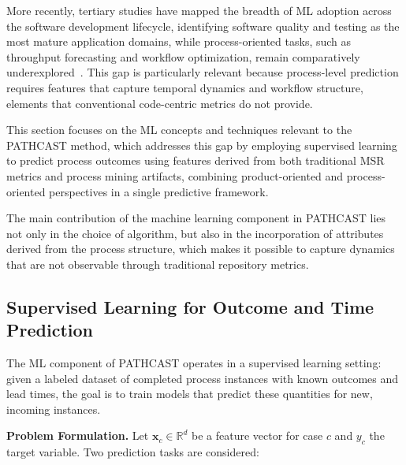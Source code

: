 More recently, tertiary
studies have mapped the breadth of ML adoption across the software development
lifecycle, identifying software quality and testing as the most mature
application domains, while process-oriented tasks, such as throughput
forecasting and workflow optimization, remain comparatively
underexplored~\cite{kotti2023}. This gap is particularly relevant because
process-level prediction requires features that capture temporal dynamics
and workflow structure, elements that conventional code-centric metrics
do not provide.

This section focuses on the ML concepts and techniques
relevant to the PATHCAST method, which addresses this gap by employing
supervised learning to predict process outcomes using features derived from
both traditional MSR metrics and process mining artifacts, combining
product-oriented and process-oriented perspectives in a single predictive
framework.

The main contribution of the machine learning component in PATHCAST lies not only in the choice of algorithm, but also in the incorporation of attributes derived from the process structure, which makes it possible to capture dynamics that are not observable through traditional repository metrics.

\subsection{Supervised Learning for Outcome and Time Prediction}
\label{sec:ml-supervised}

The ML component of PATHCAST operates in a supervised learning
setting: given a labeled dataset of completed process instances with known
outcomes and lead times, the goal is to train models that predict these
quantities for new, incoming instances.

\textbf{Problem Formulation.} Let $\mathbf{x}_c \in \mathbb{R}^d$ be a
feature vector for case $c$ and $y_c$ the target variable. Two prediction
tasks are considered:

